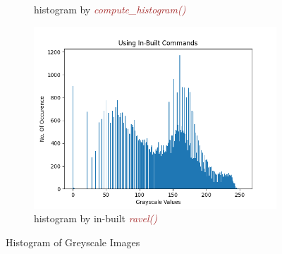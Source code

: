 \documentclass[a4paper]{article}
\begin{document}
\begin{itemize}
\begin{figure}[h!]
\begin{subfigure}[b]{0.4\linewidth}
            \caption{histogram by \textcolor{brown}{\textit{compute\_histogram()}}}
        \end{subfigure}
        \begin{subfigure}[b]{0.4\linewidth}
            \centering
            \includegraphics[width=\linewidth]{Pictures/histogram/inbuilt commands.png}
            \caption{histogram by in-built \textcolor{brown}{\textit{ravel()}}}
        \end{subfigure}
        \caption{Histogram of Greyscale Images}
        \label{greyscaleHist}
    \end{figure}


\end{itemize}
\end{document}
